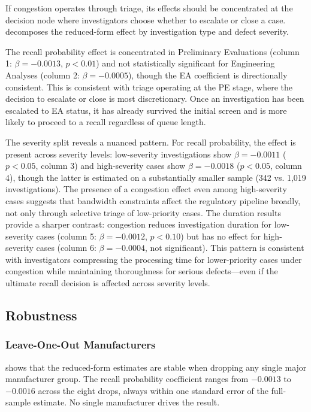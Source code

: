 \documentclass[12pt]{article}
\begin{document}
If congestion operates through triage, its effects should be concentrated at the decision node where investigators choose whether to escalate or close a case.  decomposes the reduced-form effect by investigation type and defect severity.



The recall probability effect is concentrated in Preliminary Evaluations (column 1: $\beta = -0.0013$, $p < 0.01$) and not statistically significant for Engineering Analyses (column 2: $\beta = -0.0005$), though the EA coefficient is directionally consistent. This is consistent with triage operating at the PE stage, where the decision to escalate or close is most discretionary. Once an investigation has been escalated to EA status, it has already survived the initial screen and is more likely to proceed to a recall regardless of queue length.

The severity split reveals a nuanced pattern. For recall probability, the effect is present across severity levels: low-severity investigations show $\beta = -0.0011$ ($p < 0.05$, column 3) and high-severity cases show $\beta = -0.0018$ ($p < 0.05$, column 4), though the latter is estimated on a substantially smaller sample (342 vs. 1,019 investigations). The presence of a congestion effect even among high-severity cases suggests that bandwidth constraints affect the regulatory pipeline broadly, not only through selective triage of low-priority cases. The duration results provide a sharper contrast: congestion reduces investigation duration for low-severity cases (column 5: $\beta = -0.0012$, $p < 0.10$) but has no effect for high-severity cases (column 6: $\beta = -0.0004$, not significant). This pattern is consistent with investigators compressing the processing time for lower-priority cases under congestion while maintaining thoroughness for serious defects---even if the ultimate recall decision is affected across severity levels.

\subsection{Robustness}

\subsubsection*{Leave-One-Out Manufacturers}  shows that the reduced-form estimates are stable when dropping any single major manufacturer group. The recall probability coefficient ranges from $-0.0013$ to $-0.0016$ across the eight drops, always within one standard error of the full-sample estimate. No single manufacturer drives the result.
\end{document}
